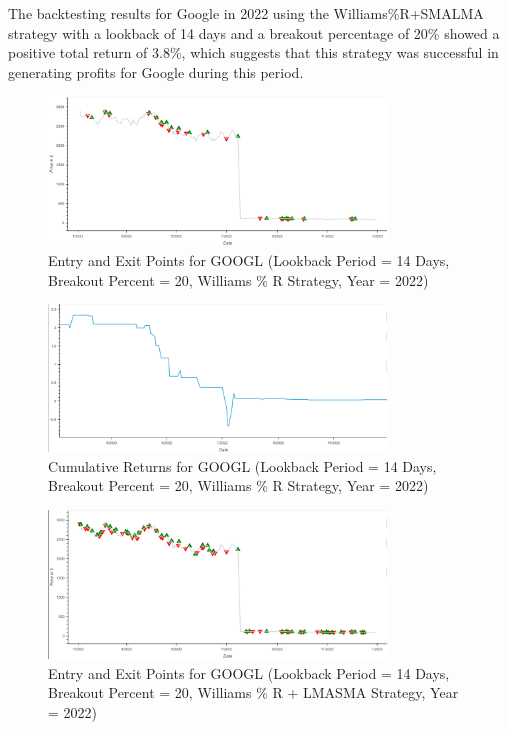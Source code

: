 The backtesting results for Google in 2022 using the Williams\%R+SMALMA strategy with a lookback of 14 days and a breakout percentage of 20\% showed a positive total return of 3.8\%, which suggests that this strategy was successful in generating profits for Google during this period.

\begin{figure}[h!]
\centering
\includegraphics[width=0.8\textwidth]{Images/google_williams_R_1.png}
\caption{Entry and Exit Points for GOOGL (Lookback Period = 14 Days, Breakout Percent = 20, Williams \% R Strategy, Year = 2022)}
\label{fig:entryexit1}
\end{figure}

\begin{figure}[h!]
\centering
\includegraphics[width=0.8\textwidth]{Images/google_williams_R_2.png}
\caption{Cumulative Returns for GOOGL (Lookback Period = 14 Days, Breakout Percent = 20, Williams \% R Strategy, Year = 2022)}
\label{fig:entryexit1}
\end{figure}

\begin{figure}[h!]
\centering
\includegraphics[width=0.8\textwidth]{Images/google_williams_lma__1.png}
\caption{Entry and Exit Points for GOOGL (Lookback Period = 14 Days, Breakout Percent = 20, Williams \% R + LMASMA Strategy, Year = 2022)}
\label{fig:entryexit1}
\end{figure}

